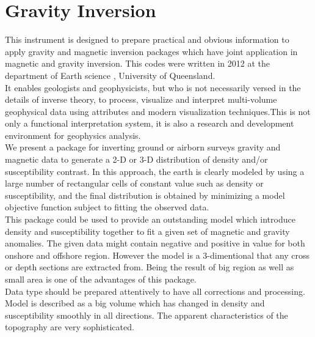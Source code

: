 \chapter{Gravity Inversion}\label{Chp:cook:gravity inversion}

This instrument is designed to prepare practical and obvious information to apply gravity and magnetic inversion packages which have joint application in magnetic and gravity inversion. This codes were written in 2012 at the department of Earth science , University of Queensland.\\
It enables geologists and geophysicists, but who is not necessarily versed in the details of inverse theory, to process, visualize and interpret multi-volume geophysical data using attributes and modern visualization techniques.This is not only a functional interpretation system, it is also a research and development environment for geophysics analysis.\\

We present a package for inverting ground or airborn surveys gravity and magnetic data to generate a 2-D or 3-D distribution of density and/or susceptibility contrast. In this approach, the earth is clearly modeled by using a large number of rectangular cells of constant value such as density or susceptibility, and the final distribution is obtained by minimizing a model objective function subject to fitting the observed data.\\

This package could be used to provide an outstanding model which introduce density and susceptibility together to fit a given set of magnetic and gravity anomalies. The given data might contain negative and positive in value for both onshore and offshore region. However the model is a 3-dimentional that any cross or depth sections are extracted from. Being the result of big region as well as small area is one of the advantages of this package.\\
Data type should be prepared attentively to have all corrections and processing. Model is described as a big volume which has changed in density and susceptibility smoothly in all directions. The apparent characteristics of the topography are very sophisticated.\\
\newpage

